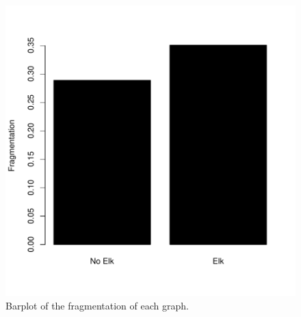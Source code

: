 \documentclass[11pt]{amsart}
\begin{document}
\begin{figure} 
\begin{center} 
\includegraphics{SPN_figures-bpF}
\end{center} 
\caption{Barplot of the fragmentation of each graph.} 
\label{fig:five}
\end{figure}









\end{document}
